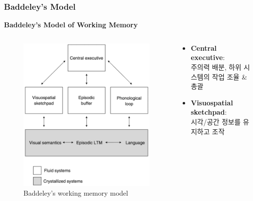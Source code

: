 \documentclass{beamer}
\begin{document}
\subsubsection{Baddeley's Model}
\begin{frame}{\textbf{Baddeley's Model of Working Memory}}
  \begin{columns}
    \begin{column}{0.38\textwidth}
      \centering
      \begin{figure}
        \centering
        \includegraphics[width=\textwidth]{image/baddeley_model}
        \caption{Baddeley’s working memory model}
      \end{figure}
    \end{column}
    \hfill
    \hspace{-5em}
    \begin{column}{0.62\textwidth}
      \vspace{-2em}
      \large
      \begin{itemize}
        \item \textbf{Central executive}: \\주의력 배분, 하위 시스템의 작업 조율 \& 총괄
        \item \textbf{Visuospatial sketchpad}: \\시각/공간 정보를 유지하고 조작

\end{itemize}
\end{column}
\end{columns}
\end{frame}
\end{document}
